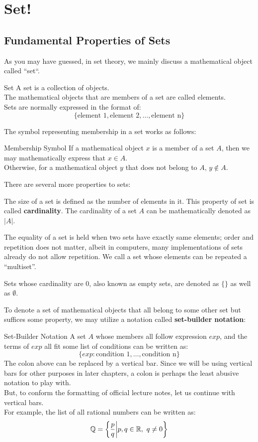 \chapter{Set!}

\section{Fundamental Properties of Sets}
As you may have guessed, in set theory, we mainly discuss a mathematical object called ``set``.
\begin{ln-define}{Set}{}
    A set is a collection of objects. \\
    The mathematical objects that are members of a set are called elements. \\
    Sets are normally expressed in the format of:
    \[\{\text{element 1}, \text{element 2}, \dots, \text{element n}\}\]
\end{ln-define}
The symbol representing membership in a set works as follows:
\begin{ln-symbol}{Membership Symbol}{}
    If a mathematical object $x$ is a member of a set $A$, then we may mathematically express that $x \in A$. \\
    Otherwise, for a mathematical object $y$ that does not belong to $A$, $y \notin A$.
\end{ln-symbol}
There are several more properties to sets:
\begin{bindenum}
    \item The size of a set is defined as the number of elements in it. This property of set is called \textbf{cardinality}. The cardinality of a set $A$ can be mathematically denoted as $|A|$.
    \item The equality of a set is held when two sets have exactly same elements; order and repetition does not matter, albeit in computers, many implementations of sets already do not allow repetition. We call a set whose elements can be repeated a ``multiset''.
    \item Sets whose cardinality are 0, also known as empty sets, are denoted as $\{\}$ as well as $\emptyset$. \\
\end{bindenum}
To denote a set of mathematical objects that all belong to some other set but suffices some property, we may utilize a notation called \textbf{set-builder notation}:
\begin{ln-symbol}{Set-Builder Notation}{}
    A set $A$ whose members all follow expression $exp$, and the terms of $exp$ all fit some list of conditions can be written as:
    \[\{exp : \text{condition 1}, \dots, \text{condition n}\}\]
    \tcblower
    The colon above can be replaced by a vertical bar. Since we will be using vertical bars for other purposes in later chapters, a colon is perhaps the least abusive notation to play with. \\
    But, to conform the formatting of official lecture notes, let us continue with vertical bars. \\
    For example, the list of all rational numbers can be written as:
    \[\mathbb{Q} = \bigg\{ \frac{p}{q} \bigg| p,q \in \mathbb{R},\ q \neq 0 \bigg\}\]
\end{ln-symbol}

